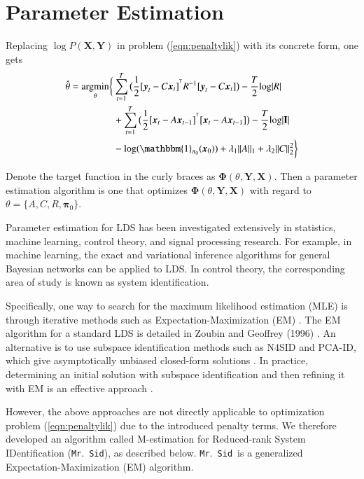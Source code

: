 \documentclass[times,twocolumn,final,authoryear]{elsarticle}
\newcommand{\mrsid}{{\sc \texttt{Mr}.~\texttt{Sid}}}
\providecommand{\mb}[1]{\boldsymbol{#1}}
\newcommand{\bx}{\mb{x}}
\newcommand{\by}{\mb{y}}
\newcommand{\bX}{\mb{X}}
\newcommand{\bY}{\mb{Y}}
\newcommand{\T}{^{\ensuremath{\mathsf{T}}}}           %
\newcommand{\argmin}{\operatornamewithlimits{argmin}}
\let\oldref\ref
\renewcommand{\ref}[1]{(\oldref{#1})}
\begin{document}
\section{Parameter Estimation}
Replacing $\log  P(\bX,\bY)$ in problem \ref{eqn:penaltylik} with its concrete form, one gets
\begin{equation}\label{eqn:penaltylik2}
\begin{split}
\hat{\theta}=\argmin_{\substack{\theta}}\biggl\{&\sum\limits_{t=1}^{T}\big(\frac{1}{2}[\by_t-C\bx_t]^{\T}R^{-1}[\by_t-C\bx_t]\big)-\frac{T}{2}\text{log}|R|\\
&+\sum\limits_{t=1}^{T}\big(\frac{1}{2}[\bx_t-A\bx_{t-1}]^{\T}[\bx_t-A\bx_{t-1}]\big)-\frac{T}{2}\text{log}|\mathbf{I}|\\
&- \text{log}(\mathbbm{1}_{\mathbf{\pi}_0}(\bx_0))+\lambda_1\|A\|_1+\lambda_2\|C\|_2^2\biggr\}\\
\end{split}
\end{equation}

Denote the target function in the curly braces as $\mathbf{\Phi}(\theta,\bY,\bX)$. Then a parameter estimation algorithm is one that optimizes $\mathbf{\Phi}(\theta,\bY,\bX)$ with regard to $\theta=\{A,C,R,\mathbf{\pi}_0\}$.

Parameter estimation for LDS has been investigated extensively in statistics, machine learning, control theory, and signal processing research. For example, in machine learning, the exact and variational inference algorithms for general Bayesian networks can be applied to LDS. In control theory, the corresponding area of study is known as system identification.

Specifically, one way to search for the maximum likelihood estimation (MLE) is through iterative methods such as Expectation-Maximization (EM) \citep{shumway1982approach}. The EM algorithm for a standard LDS is detailed in Zoubin and Geoffrey (1996) \citep{ghahramani1996parameter}. An alternative is to use subspace identification methods such as N4SID and PCA-ID, which give asymptotically unbiased closed-form solutions \citep{van1994n4sid,doretto2003dynamic}. In practice, determining an initial solution with subspace identification and then refining it with EM is an effective approach \citep{boots2009learning}.

However, the above approaches are not directly applicable to optimization problem \ref{eqn:penaltylik} due to the introduced penalty terms. We therefore developed an algorithm called M-estimation for Reduced-rank System IDentification (\mrsid), as described below. \mrsid\  is a generalized Expectation-Maximization (EM) algorithm.
\end{document}

